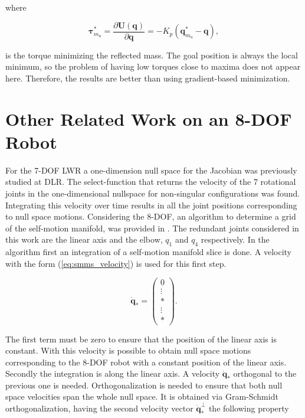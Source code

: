 where 

\begin{equation}
\mathbf{\tau}_{m_u}^\ast = \frac{\partial {\mathbf{U}(\mathbf{q})}}{\partial {\mathbf{q}}} = - K_p (\mathbf{q}_{m_u}^\ast - \mathbf{q}),
\label{eq:torque_pot_intro}
\end{equation}

is the torque minimizing the reflected mass.
The goal position is always the local minimum, so the problem of having low torques close to maxima does not appear here. Therefore, the results are better than using gradient-based minimization.


\section{Other Related Work on an 8-DOF Robot}
\label{sec:Fabianstuff}


For the 7-DOF LWR a  one-dimension null space for the Jacobian   was previously studied at DLR.  
The select-function that returns the velocity of the 7 rotational joints in the one-dimensional nullspace for non-singular configurations was found. Integrating this velocity over time results in all the joint positions corresponding to null space motions.
%
Considering the  8-DOF, an algorithm to determine a grid of the self-motion manifold, was provided in \cite{fabianthesis}. The redundant joints considered in this work are the linear axis and the elbow, $q_1$ and $q_4$ respectively. In the algorithm first an integration of a self-motion manifold slice is done. A velocity with the form (\ref{eq:smms_velocity}) is used for this first step. 

\begin{equation}
\dot{\mathbf{q}}_* =\begin{pmatrix}0 \\ \vdots  \\ *\\ \vdots\\ *\end{pmatrix}.
\label{eq:smms_velocity}
\end{equation} 

The first term must be zero to ensure that the position of the linear axis is constant.
With this velocity is possible to obtain null space motions corresponding to the 8-DOF robot with a constant position of the linear axis.
Secondly the integration is along the linear axis. A velocity $\dot{\mathbf{q}}_*$ orthogonal to the previous one is needed. Orthogonalization is needed to ensure that both null space velocities span the whole null space. It is obtained via Gram-Schmidt orthogonalization, having the second velocity vector $\dot{\mathbf{q}}_*^{\bot}$ the following property


